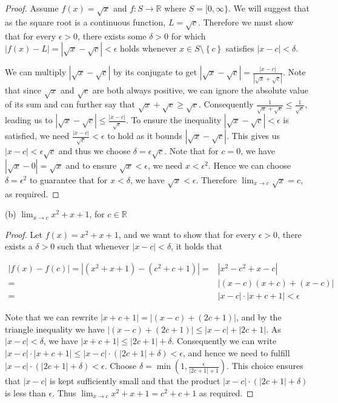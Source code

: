 \documentclass[12pt]{article}
\newcommand{\set}[1]{\left\{ {#1} \right\}}
\newcommand{\limit}[1]{\displaystyle \lim_{ {#1} }}
\newcommand{\abs}[1]{\left| {#1} \right|}
\newcommand{\paren}[1]{\left( {#1} \right)}
\newcommand{\bR}{\mathbb{R}}
\begin{document}
\begin{proof}
	Assume $f(x)=\sqrt{x}$ and $f:S\to\bR$ where $S=[0,\infty\}$. We will suggest that as the square root is a continuous function, $L=\sqrt{c}$. Therefore we must show that for every $\epsilon>0$, there exists some $\delta>0$ for which $\abs{f(x)-L}=\abs{\sqrt{x}-\sqrt{c}}<\epsilon$ holds whenever $x\in S\setminus\set{c}$ satisfies $\abs{x-c}<\delta$. 
	
We can multiply $\abs{\sqrt{x}-\sqrt{c}}$ by its conjugate to get $\abs{\sqrt{x}-\sqrt{c}}=\frac{\abs{x-c}}{\abs{\sqrt{x}+\sqrt{c}}}$. Note that since $\sqrt{x}$ and $\sqrt{c}$ are both always positive, we can ignore the absolute value of its sum and can further say that $\sqrt{x}+\sqrt{c}\ge\sqrt{c}$. Consequently $\frac{1}{\sqrt{x}+\sqrt{c}}\le\frac{1}{\sqrt{c}}$, leading us to $\abs{\sqrt{x}-\sqrt{c}}\le\frac{\abs{x-c}}{\sqrt{c}}$. To ensure the inequality $\abs{\sqrt{x}-\sqrt{c}}<\epsilon$ is satisfied, we need $\frac{\abs{x-c}}{\sqrt{c}}<\epsilon$ to hold as it bounds $\abs{\sqrt{x}-\sqrt{c}}$. This gives us $\abs{x-c}<\epsilon\sqrt{c}$ and thus we choose $\delta=\epsilon\sqrt{c}$. Note that for $c=0$, we have $\abs{\sqrt{x}-0}=\sqrt{x}$ and to ensure $\sqrt{x}<\epsilon$, we need $x<\epsilon^2$. Hence we can choose $\delta=\epsilon^2$ to guarantee that for $x<\delta$, we have $\sqrt{x}<\epsilon$. Therefore $\limit{x\to c} \sqrt{x}=c$, as required.
\end{proof}

\noindent (b) $\limit{x\to c}x^2 + x + 1$, for $c\in\bR$

\begin{proof}
	Let $f(x)=x^2+x+1$, and we want to show that for every $\epsilon>0$, there exists a $\delta>0$ such that whenever $\abs{x-c}<\delta$, it holds that 
	
\begin{align*}
	\abs{f(x)-f(c)}=\abs{(x^2+x+1)-(c^2+c+1)}=&\abs{x^2-c^2+x-c} \\
	=&\abs{(x-c)(x+c)+(x-c)} \\
	=&\abs{x-c}\cdot\abs{x+c+1} <\epsilon
\end{align*}

Note that we can rewrite $\abs{x+c+1}=\abs{(x-c)+(2c+1)}$, and by the triangle inequality we have $\abs{(x-c)+(2c+1)}\le\abs{x-c}+\abs{2c+1}$. As $\abs{x-c}<\delta$, we have $\abs{x+c+1}\le\abs{2c+1}+\delta$. Consequently we can write $\abs{x-c}\cdot\abs{x+c+1}\le\abs{x-c}\cdot\paren{\abs{2c+1}+\delta}<\epsilon$, and hence we need to fulfill $\abs{x-c}\cdot\paren{\abs{2c+1}+\delta}<\epsilon$. Choose $\delta=\min\paren{1,\frac{\epsilon}{\abs{2c+1}+1}}$. This choice ensures that $\abs{x-c}$ is kept sufficiently small and that the product $\abs{x-c}\cdot\paren{\abs{2c+1}+\delta}$ is less than $\epsilon$. Thus $\limit{x\to c}x^2 + x + 1=c^2+c+1$ as required.
\end{proof}
\end{document}
